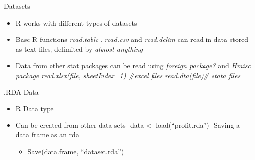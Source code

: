 \documentclass[
  ignorenonframetext,
]{beamer}
\providecommand{\tightlist}{%
  \setlength{\itemsep}{0pt}\setlength{\parskip}{0pt}}
\begin{document}
\begin{frame}{Datasets}
\protect\hypertarget{datasets}{}

\begin{itemize}
\tightlist
\item
  R works with different types of datasets
\item
  Base R functions \emph{read.table} , \emph{read.csv} and
  \emph{read.delim} can read in data stored as text files, delimited by
  \emph{almost anything}
\item
  Data from other stat packages can be read using \emph{foreign
  package?} and \emph{Hmisc package} \newline \emph{read.xlsx(file,
  sheetIndex=1) \#excel files} \newline \emph{read.dta(file)\# stata
  files}
\end{itemize}

\end{frame}

\begin{frame}{.RDA Data}
\protect\hypertarget{rda-data}{}

\begin{itemize}
\tightlist
\item
  R Data type
\item
  Can be created from other data sets -data \textless-
  load(``profit.rda'') -Saving a data frame as an rda

  \begin{itemize}
  \tightlist
  \item
    Save(data.frame, ``dataset.rda'')
  \end{itemize}
\end{itemize}

\end{frame}
\end{document}
